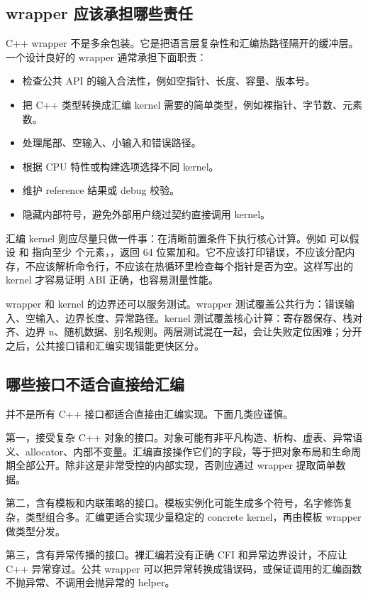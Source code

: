 \subsection{wrapper 应该承担哪些责任}

C++ wrapper 不是多余包装。它是把语言层复杂性和汇编热路径隔开的缓冲层。一个设计良好的 wrapper 通常承担下面职责：

\begin{itemize}
  \item 检查公共 API 的输入合法性，例如空指针、长度、容量、版本号。
  \item 把 C++ 类型转换成汇编 kernel 需要的简单类型，例如裸指针、字节数、元素数。
  \item 处理尾部、空输入、小输入和错误路径。
  \item 根据 CPU 特性或构建选项选择不同 kernel。
  \item 维护 reference 结果或 debug 校验。
  \item 隐藏内部符号，避免外部用户绕过契约直接调用 kernel。
\end{itemize}

汇编 kernel 则应尽量只做一件事：在清晰前置条件下执行核心计算。例如  可以假设  和  指向至少  个元素，，返回 64 位累加和。它不应该打印错误，不应该分配内存，不应该解析命令行，不应该在热循环里检查每个指针是否为空。这样写出的 kernel 才容易证明 ABI 正确，也容易测量性能。

wrapper 和 kernel 的边界还可以服务测试。wrapper 测试覆盖公共行为：错误输入、空输入、边界长度、异常路径。kernel 测试覆盖核心计算：寄存器保存、栈对齐、边界 n、随机数据、别名规则。两层测试混在一起，会让失败定位困难；分开之后，公共接口错和汇编实现错能更快区分。

\subsection{哪些接口不适合直接给汇编}

并不是所有 C++ 接口都适合直接由汇编实现。下面几类应谨慎。

第一，接受复杂 C++ 对象的接口。对象可能有非平凡构造、析构、虚表、异常语义、allocator、内部不变量。汇编直接操作它们的字段，等于把对象布局和生命周期全部公开。除非这是非常受控的内部实现，否则应通过 wrapper 提取简单数据。

第二，含有模板和内联策略的接口。模板实例化可能生成多个符号，名字修饰复杂，类型组合多。汇编更适合实现少量稳定的 concrete kernel，再由模板 wrapper 做类型分发。

第三，含有异常传播的接口。裸汇编若没有正确 CFI 和异常边界设计，不应让 C++ 异常穿过。公共 wrapper 可以把异常转换成错误码，或保证调用的汇编函数不抛异常、不调用会抛异常的 helper。

